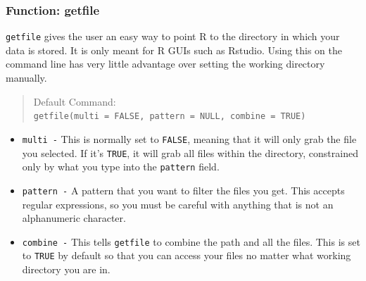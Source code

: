 \documentclass[letterpaper]{article}
\newcommand{\tab}{\hspace*{1em}}
\begin{document}
\subsubsection{Function: getfile}\label{intro:import:getfile}
\tab\tab \texttt{getfile} gives the user an easy way to point R to the directory in which your data is stored. It is only meant for R GUIs such as Rstudio. Using this on the command line has very little advantage over setting the working directory manually. 
\begin{quote}
Default Command:\\
\texttt{getfile(multi = FALSE, pattern = NULL, combine = TRUE)}
\end{quote}
\begin{itemize}
  \item \texttt{multi -} This is normally set to \texttt{FALSE}, meaning that it will only grab the file you selected. If it's \texttt{TRUE}, it will grab all files within the directory, constrained only by what you type into the \texttt{pattern} field.
  \item \texttt{pattern -} A pattern that you want to filter the files you get. This accepts regular expressions, so you must be careful with anything that is not an alphanumeric character.
  \item \texttt{combine -} This tells \texttt{getfile} to combine the path and all the files. This is set to \texttt{TRUE} by default so that you can access your files no matter what working directory you are in. 
\end{itemize}
\end{document}

